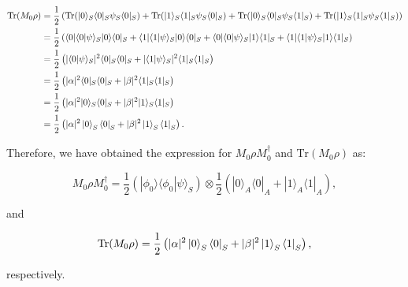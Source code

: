 \documentclass{article}
\begin{document}
\begin{align*}
    \text{Tr}(M_0\rho) & = \frac{1}{2}\left(\text{Tr}(|0\rangle_S\langle0|_S\psi_S\langle0|_S) + \text{Tr}(|1\rangle_S\langle1|_S\psi_S\langle0|_S) + \text{Tr}(|0\rangle_S\langle0|_S\psi_S\langle1|_S) + \text{Tr}(|1\rangle_S\langle1|_S\psi_S\langle1|_S)\right)     \\
                       & = \frac{1}{2}\left(\langle0|\langle0|\psi\rangle_S|0\rangle\langle0|_S + \langle1|\langle1|\psi\rangle_S|0\rangle\langle0|_S + \langle0|\langle0|\psi\rangle_S|1\rangle\langle1|_S + \langle1|\langle1|\psi\rangle_S|1\rangle\langle1|_S\right) \\
                       & = \frac{1}{2}\left(|\langle0|\psi\rangle_S|^2\langle0|_S\langle0|_S + |\langle1|\psi\rangle_S|^2\langle1|_S\langle1|_S\right)                                                                                                                   \\
                       & = \frac{1}{2}\left(|\alpha|^2\langle0|_S\langle0|_S + |\beta|^2\langle1|_S\langle1|_S\right)                                                                                                                                                    \\
                       & = \frac{1}{2}\left(|\alpha|^2|0\rangle_S\langle0|_S + |\beta|^2|1\rangle_S\langle1|_S\right)                                                                                                                                                    \\
                       & = \frac{1}{2}\left(|\alpha|^2\ket{0}_S\bra{0}_S + |\beta|^2\ket{1}_S\bra{1}_S\right).
\end{align*}

Therefore, we have obtained the expression for $M_0\rho M_0^{\dagger}$ and $\text{Tr}(M_0\rho)$ as:

\[
    M_0\rho M_0^{\dagger} = \frac{1}{2}(|\phi_0\rangle\langle\phi_0|\psi\rangle_S) \otimes \frac{1}{2}(|0\rangle_A\langle0|_A + |1\rangle_A\langle1|_A),
\]

and

\[
    \text{Tr}(M_0\rho) = \frac{1}{2}\left(|\alpha|^2\ket{0}_S\bra{0}_S + |\beta|^2\ket{1}_S\bra{1}_S\right),
\]

respectively.
\end{document}
